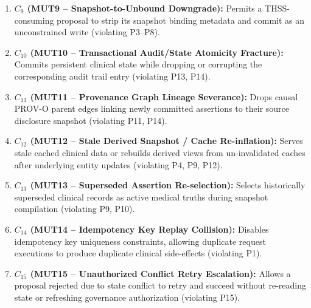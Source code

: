 \documentclass[runningheads]{llncs}
\begin{document}
\begin{enumerate}
    \item \textbf{$C_9$ (MUT9 -- Snapshot-to-Unbound Downgrade):} Permits a THSS-consuming proposal to strip its snapshot binding metadata and commit as an unconstrained write (violating P3--P8).
    \item \textbf{$C_{10}$ (MUT10 -- Transactional Audit/State Atomicity Fracture):} Commits persistent clinical state while dropping or corrupting the corresponding audit trail entry (violating P13, P14).
    \item \textbf{$C_{11}$ (MUT11 -- Provenance Graph Lineage Severance):} Drops causal PROV-O parent edges linking newly committed assertions to their source disclosure snapshot (violating P11, P14).
    \item \textbf{$C_{12}$ (MUT12 -- Stale Derived Snapshot / Cache Re-inflation):} Serves stale cached clinical data or rebuilds derived views from un-invalidated caches after underlying entity updates (violating P4, P9, P12).
    \item \textbf{$C_{13}$ (MUT13 -- Superseded Assertion Re-selection):} Selects historically superseded clinical records as active medical truths during snapshot compilation (violating P9, P10).
    \item \textbf{$C_{14}$ (MUT14 -- Idempotency Key Replay Collision):} Disables idempotency key uniqueness constraints, allowing duplicate request executions to produce duplicate clinical side-effects (violating P1).
    \item \textbf{$C_{15}$ (MUT15 -- Unauthorized Conflict Retry Escalation):} Allows a proposal rejected due to state conflict to retry and succeed without re-reading state or refreshing governance authorization (violating P15).
\end{enumerate}
\end{document}
